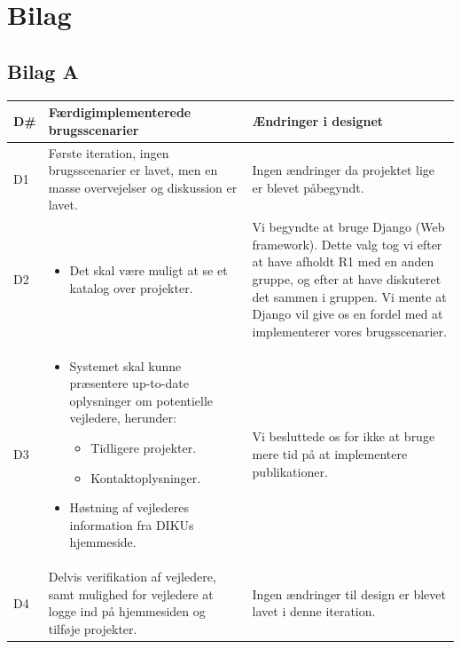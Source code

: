 \documentclass[12pt]{article}
\begin{document}
\newpage
\section{Bilag}
\label{sec:bilag}

\subsection{Bilag A}
\label{sec:bilagA}
\begin{center}
	\begin{tabular}{|p{}|p{}|p{}|}
		\hline
	\textbf{D\#} & \textbf{Færdigimplementerede brugsscenarier} & \textbf{Ændringer i designet} \\ \hline

	D1 & Første iteration, ingen brugsscenarier er lavet, men en masse overvejelser og diskussion er lavet. & Ingen ændringer da projektet lige er blevet påbegyndt. \\ \hline

	D2 & 		\begin{minipage}[t]{0.4\textwidth}
	\begin{itemize}
		\item Det skal være muligt at se et katalog over projekter.
		\end{itemize}
		\end{minipage} & Vi begyndte at bruge Django (Web framework). Dette valg tog vi efter at have afholdt R1 med en anden gruppe, og efter at have diskuteret det sammen i gruppen. Vi mente at Django vil give os en fordel med at implementerer vores brugsscenarier. \\ \hline

	D3 &
	\begin{minipage}[t]{0.4\textwidth}
	\begin{itemize}
		\item Systemet skal kunne præsentere up-to-date oplysninger om potentielle vejledere, herunder:
		\begin{itemize}
			\item Tidligere projekter.
			\item Kontaktoplysninger.
		\end{itemize}
		\item Høstning af vejlederes information fra DIKUs hjemmeside.
	\end{itemize}
	\end{minipage} & Vi besluttede os for ikke at bruge mere tid på at implementere publikationer. \\
		\hline
	D4 & Delvis verifikation af vejledere, samt mulighed for vejledere at logge ind på hjemmesiden og tilføje projekter. & Ingen ændringer til design er blevet lavet i denne iteration. \\ \hline
	\end{tabular}
\end{center}~\\
\end{document}
